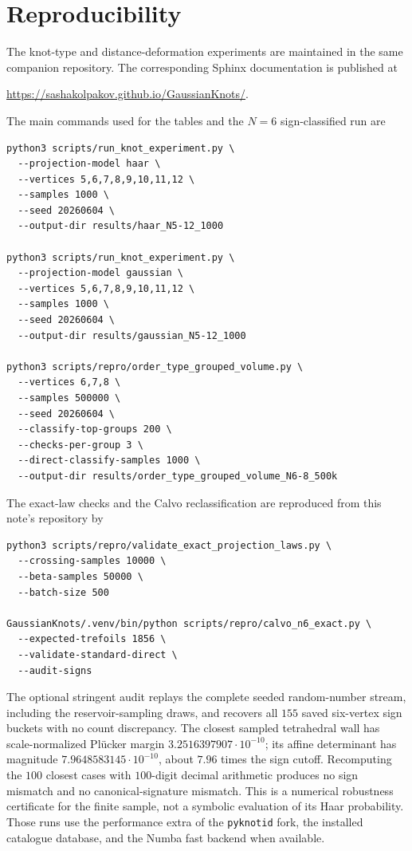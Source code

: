 \documentclass[11pt]{amsart}
\theoremstyle{remark}
\newcommand{\1}{\mathbf{1}}
\begin{document}
\section{Reproducibility}

The knot-type and distance-deformation experiments are maintained in the same
companion repository.
The corresponding Sphinx documentation is published at
\begin{center}
\url{https://sashakolpakov.github.io/GaussianKnots/}.
\end{center}
The main commands used for the tables and the \(N=6\) sign-classified run are
\begin{verbatim}
python3 scripts/run_knot_experiment.py \
  --projection-model haar \
  --vertices 5,6,7,8,9,10,11,12 \
  --samples 1000 \
  --seed 20260604 \
  --output-dir results/haar_N5-12_1000

python3 scripts/run_knot_experiment.py \
  --projection-model gaussian \
  --vertices 5,6,7,8,9,10,11,12 \
  --samples 1000 \
  --seed 20260604 \
  --output-dir results/gaussian_N5-12_1000

python3 scripts/repro/order_type_grouped_volume.py \
  --vertices 6,7,8 \
  --samples 500000 \
  --seed 20260604 \
  --classify-top-groups 200 \
  --checks-per-group 3 \
  --direct-classify-samples 1000 \
  --output-dir results/order_type_grouped_volume_N6-8_500k
\end{verbatim}
The exact-law checks and the Calvo reclassification are reproduced from this
note's repository by
\begin{verbatim}
python3 scripts/repro/validate_exact_projection_laws.py \
  --crossing-samples 10000 \
  --beta-samples 50000 \
  --batch-size 500

GaussianKnots/.venv/bin/python scripts/repro/calvo_n6_exact.py \
  --expected-trefoils 1856 \
  --validate-standard-direct \
  --audit-signs
\end{verbatim}
The optional stringent audit replays the complete seeded random-number stream,
including the reservoir-sampling draws, and recovers all \(155\) saved
six-vertex sign buckets with no count discrepancy.  The closest sampled
tetrahedral wall has scale-normalized Pl\"ucker margin
\(3.2516397907\cdot10^{-10}\); its affine determinant has magnitude
\(7.9648583145\cdot10^{-10}\), about \(7.96\) times the sign cutoff.
Recomputing the \(100\) closest cases with \(100\)-digit decimal arithmetic
produces no sign mismatch and no canonical-signature mismatch.  This is a
numerical robustness certificate for the finite sample, not a symbolic
evaluation of its Haar probability.
Those runs use the performance extra of the \texttt{pyknotid} fork, the installed catalogue
database, and the Numba fast backend when available.
\end{document}
